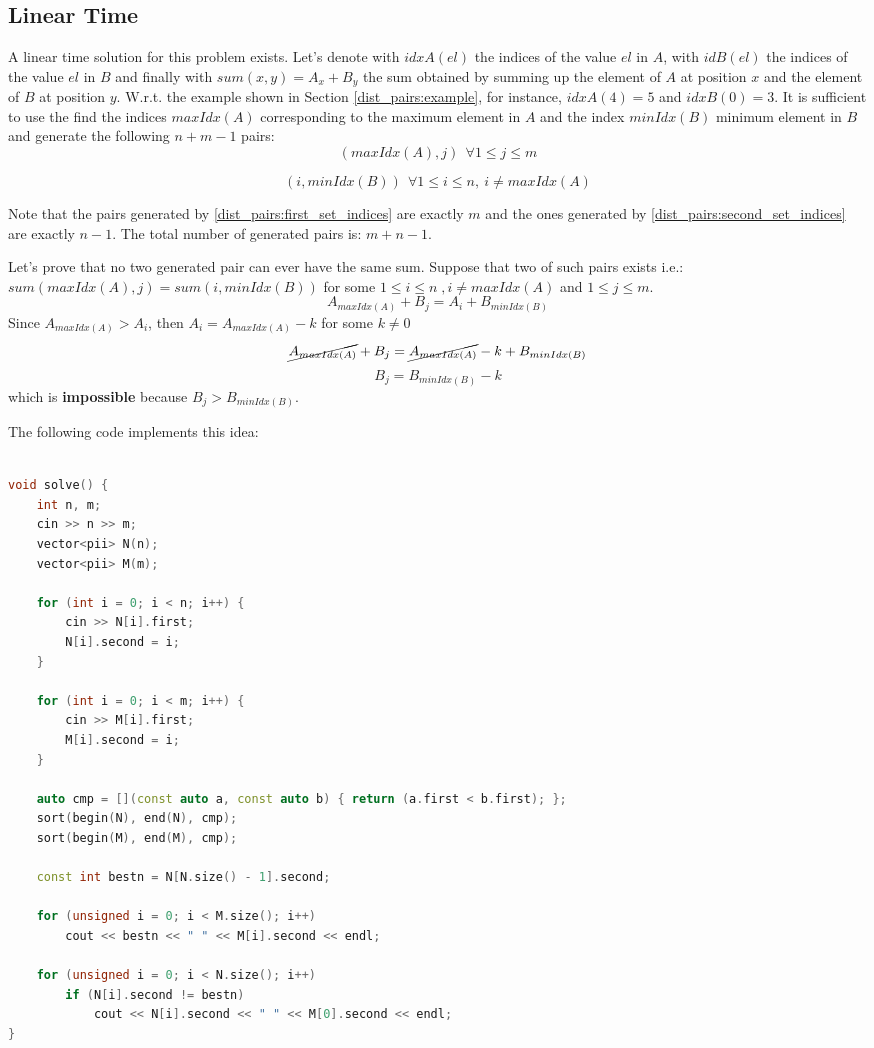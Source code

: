 \subsection{Linear Time}
A linear time solution for this problem exists.
Let's denote with $idxA(el)$ the indices of the value $el$ in $A$, with  $idB(el)$ the indices of the value $el$ in $B$ and finally with $sum(x,y)=A_x + B_y$ the sum obtained by summing up the element of $A$ at position $x$ and the element of $B$ at position $y$.
W.r.t. the example shown in Section \ref{dist_pairs:example}, for instance, $idxA(4) = 5$ and $idxB(0) = 3$.
It is sufficient to use the find the indices $maxIdx(A)$ corresponding to the maximum element in $A$ and the index $minIdx(B)$ minimum element in $B$ and generate the following $n+m-1$ pairs:
\begin{equation}
\label{dist_pairs:first_set_indices}
(maxIdx(A), j )\:\: \forall 1 \leq j \leq m
\end{equation}

\begin{equation}
\label{dist_pairs:second_set_indices}
(i, minIdx(B) )\:\: \forall 1 \leq i \leq n,\: i \neq maxIdx(A)
\end{equation}

Note that the pairs generated by \ref{dist_pairs:first_set_indices} are exactly $m$ and the ones generated by \ref{dist_pairs:second_set_indices} are exactly $n-1$. The total number of generated pairs is: $m+n-1$.

Let's prove that no two generated pair can ever have the same sum.
Suppose that two of such pairs exists i.e.:
$sum(maxIdx(A), j) = sum(i, minIdx(B))$ for some $1 \leq i \leq n\;, i \neq maxIdx(A)$ and $1 \leq j \leq m$.
\[A_{maxIdx(A)} + B_j = A_i + B_{minIdx(B)}\]
Since $A_{maxIdx(A)} > A_i$, then $A_i = A_{maxIdx(A)}- k$ for some $k \neq 0$
\[\cancel{A_{maxIdx(A)}} + B_j = \cancel{A_{maxIdx(A)}}- k + B_{minIdx(B)}\]
\[B_j = B_{minIdx(B)} - k\] which is \textbf{impossible} because $B_j > B_{minIdx(B)}$.

The following code implements this idea:
\begin{lstlisting}[language=c++, caption="Distinc pair problem. Brute force approach.",label=list:knapexp]

void solve() {
	int n, m;
	cin >> n >> m;
	vector<pii> N(n);
	vector<pii> M(m);

	for (int i = 0; i < n; i++) {
		cin >> N[i].first;
		N[i].second = i;
	}
	
	for (int i = 0; i < m; i++) {
		cin >> M[i].first;
		M[i].second = i;
	}
	
	auto cmp = [](const auto a, const auto b) { return (a.first < b.first); };
	sort(begin(N), end(N), cmp);
	sort(begin(M), end(M), cmp);
	
	const int bestn = N[N.size() - 1].second;
	
	for (unsigned i = 0; i < M.size(); i++)
		cout << bestn << " " << M[i].second << endl;
	
	for (unsigned i = 0; i < N.size(); i++)
		if (N[i].second != bestn) 
			cout << N[i].second << " " << M[0].second << endl;
}
\end{lstlisting}


